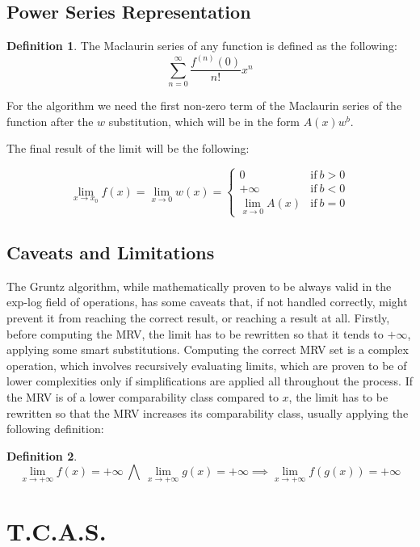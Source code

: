 \documentclass{article}
\theoremstyle{plain}
\theoremstyle{definition}
\newtheorem*{defn*}{Definition}
\theoremstyle{algorithm}
\begin{document}
	\subsection{Power Series Representation}
	
	\begin{defn*}
		The Maclaurin series of any function is defined as the following:
		\[
		\sum_{n=0}^{\infty}{\frac{f^{(n)}(0)}{n!} x^{n}}
		\]
	\end{defn*}
	
	For the algorithm we need the first non-zero term of the Maclaurin series of the function after the \(w\) substitution, which will be in the form \(A(x)w^b\).
	
	The final result of the limit will be the following:
	
	\[
	\lim_{x \to x_{0}}{f(x)} = \lim_{x \to 0}{w(x)} = \begin{cases}
		0 &\text{if} \: b > 0 \\
		+\infty &\text{if} \: b < 0\\
		\lim_{x \to 0}{A(x)} &\text{if} \: b = 0
	\end{cases}
	\]
	
	\subsection{Caveats and Limitations}
	
	The Gruntz algorithm, while mathematically proven to be always valid in the exp-log field of operations, has some caveats that, if not handled correctly, might prevent it from reaching the correct result, or reaching a result at all. Firstly, before computing the MRV, the limit has to be rewritten so that it tends to \(+\infty\), applying some smart substitutions.
	Computing the correct MRV set is a complex operation, which involves recursively evaluating limits, which are proven to be of lower complexities only if simplifications are applied all throughout the process. If the MRV is of a lower comparability class compared to \({x}\), the limit has to be rewritten so that the MRV increases its comparability class, usually applying the following definition:
	
	\begin{defn*}
		\[
		\lim_{x \to +\infty}{f(x)}=+\infty \: \bigwedge \: \lim_{x \to +\infty}{g(x)}=+\infty \implies \lim_{x \to +\infty}{f(g(x))}=+\infty
		\]
	\end{defn*}
	
	\section{T.C.A.S.}
	
\end{document}
